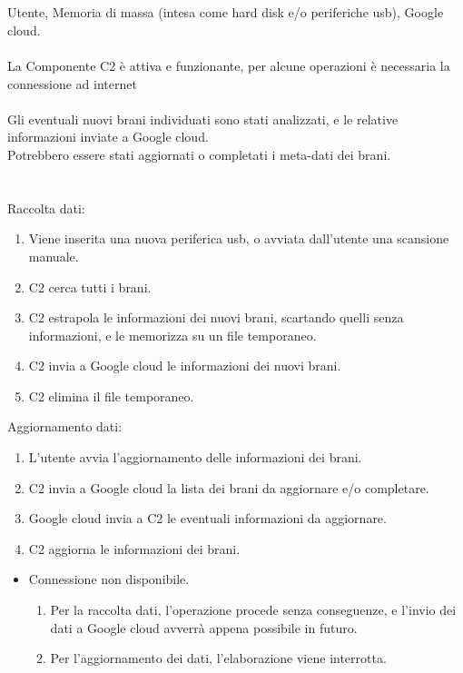 \newpage
\vspace*{0.5cm}
\\\\
 Utente, Memoria di massa (intesa come hard disk e/o
periferiche usb), Google cloud. \\\\  La Componente C2 \`e
attiva e funzionante, per alcune operazioni \`e necessaria la connessione ad internet \\\\
Gli eventuali nuovi brani individuati sono stati analizzati, e le relative
informazioni inviate a Google cloud.\\
Potrebbero essere stati aggiornati o completati i meta-dati dei brani. \\\\
 \\
Raccolta dati:
\begin{enumerate}
  \item Viene inserita una nuova periferica usb, o avviata dall'utente una
  scansione manuale.
  \item C2 cerca tutti i brani.
  \item C2 estrapola le informazioni dei nuovi brani, scartando quelli senza
  informazioni, e le memorizza su un file temporaneo.
  \item C2 invia a Google cloud le informazioni dei nuovi brani.
  \item C2 elimina il file temporaneo.
\end{enumerate}
Aggiornamento dati:
\begin{enumerate}
  \item L'utente avvia l'aggiornamento delle informazioni dei brani.
  \item C2 invia a Google cloud la lista dei brani da aggiornare e/o completare.
  \item Google cloud invia a C2 le eventuali informazioni da aggiornare.
  \item C2 aggiorna le informazioni dei brani.
\end{enumerate}
\begin{itemize}
  \item Connessione non disponibile.
  \begin {enumerate}
    \item Per la raccolta dati, l'operazione procede senza conseguenze, e
    l'invio dei dati a Google cloud avverr\`a appena possibile in futuro.
    \item Per l'aggiornamento dei dati, l'elaborazione viene interrotta.
  \end{enumerate}
\end{itemize}
\newpage


